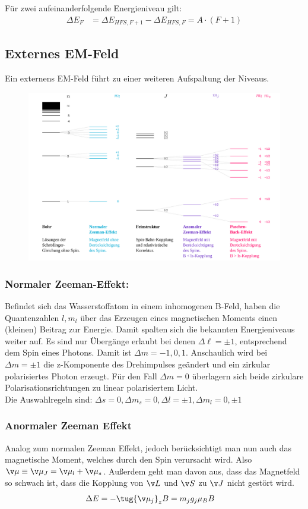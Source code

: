 \documentclass[twocolumn]{summery_4.1}
\begin{document}
Für zwei aufeinanderfolgende Energieniveau gilt:
\begin{align*}
    \Delta E_F &= \Delta E_{HFS,F+1}- \Delta E_{HFS,F} =  A\cdot (F+1)
\end{align*}

\subsection{Externes EM-Feld}

Ein externens EM-Feld führt zu einer weiteren Aufspaltung der Niveaus.
\begin{figure}[H]
    \centering
    \includegraphics[width=.49\textwidth]{Wasserstoff_Zeeman.png}
\end{figure}  

\subsubsection{Normaler Zeeman-Effekt:}
Befindet sich das Wasserstoffatom in einem inhomogenen B-Feld, haben die Quantenzahlen \(l,m_l\) über das Erzeugen eines magnetischen Moments einen (kleinen) Beitrag zur Energie. Damit spalten sich die bekannten Energieniveaus weiter auf.     
Es sind nur Übergänge erlaubt bei denen \(\Delta \ell=\pm 1\), entsprechend dem Spin eines Photons. Damit ist \(\Delta m = -1,0,1\).
Anschaulich wird bei $\Delta m = \pm1$ die z-Komponente des Drehimpulses geändert
und ein zirkular polarisiertes Photon erzeugt. Für den Fall $\Delta m = 0$ überlagern sich beide zirkulare
Polarisationsrichtungen zu linear polarisiertem Licht.\\
Die Auswahlregeln sind: \(\Delta s = 0, \Delta m_s=0, \Delta l =\pm 1, \Delta m_l = 0,\pm1\)

\subsubsection{Anormaler Zeeman Effekt}
Analog zum normalen Zeeman Effekt, jedoch berücksichtigt man nun auch das magnetische Moment, welches durch den Spin verursacht wird. 
Also \(\v \mu \equiv \v \mu_J = \v \mu_l + \v \mu_s\). Außerdem geht man davon aus, dass das Magnetfeld so schwach ist, dass die Kopplung von \(\v L\) und \(\v S\) zu \(\v J\) nicht gestört wird. 
\begin{align*}
    \Delta E &= - \tug{\v \mu_j}_z B = m_j g_j \mu_B B
\end{align*}
\end{document}
